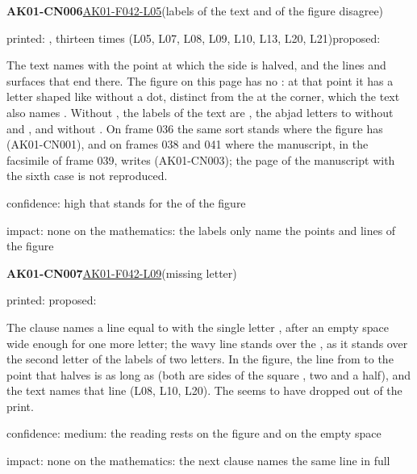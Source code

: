 \documentclass[11pt]{article}
\begin{document}
\noindent\textbf{AK01-CN006}\enspace\hyperlink{AK01-F042-L05}{AK01-F042-L05}\enspace(labels of the text and of the figure disagree)\par\noindent printed: , thirteen times (L05, L07, L08, L09, L10, L13, L20, L21)\enspace proposed: \par\noindent The text names with  the point at which the side  is halved, and the lines and surfaces that end there. The figure on this page has no : at that point it has a letter shaped like  without a dot, distinct from the  at the corner, which the text also names . Without , the labels of the text are , the abjad letters to  without  and , and without . On frame 036 the same sort stands where the figure has  (AK01-CN001), and on frames 038 and 041 where the manuscript, in the facsimile of frame 039, writes  (AK01-CN003); the page of the manuscript with the sixth case is not reproduced.\par\noindent confidence: high that  stands for the  of the figure\par\noindent impact: none on the mathematics: the labels only name the points and lines of the figure\par\medskip
\noindent\textbf{AK01-CN007}\enspace\hyperlink{AK01-F042-L09}{AK01-F042-L09}\enspace(missing letter)\par\noindent printed: \enspace proposed: \par\noindent The clause names a line equal to  with the single letter , after an empty space wide enough for one more letter; the wavy line stands over the , as it stands over the second letter of the labels of two letters. In the figure, the line from  to the point that halves  is as long as  (both are sides of the square , two and a half), and the text names that line  (L08, L10, L20). The  seems to have dropped out of the print.\par\noindent confidence: medium: the reading  rests on the figure and on the empty space\par\noindent impact: none on the mathematics: the next clause names the same line in full\par\medskip
\end{document}

